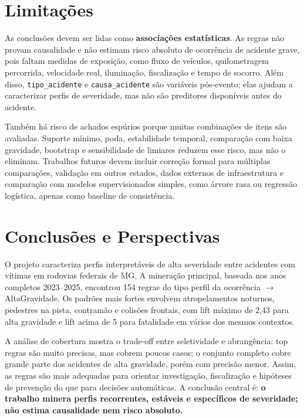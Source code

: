 \documentclass[12pt]{article}
\begin{document}
\section{Limitações}

As conclusões devem ser lidas como \textbf{associações estatísticas}. As regras não provam causalidade e não estimam risco absoluto de ocorrência de acidente grave, pois faltam medidas de exposição, como fluxo de veículos, quilometragem percorrida, velocidade real, iluminação, fiscalização e tempo de socorro. Além disso, \texttt{tipo\_acidente} e \texttt{causa\_acidente} são variáveis pós-evento; elas ajudam a caracterizar perfis de severidade, mas não são preditores disponíveis antes do acidente.

Também há risco de achados espúrios porque muitas combinações de itens são avaliadas. Suporte mínimo, poda, estabilidade temporal, comparação com baixa gravidade, bootstrap e sensibilidade de limiares reduzem esse risco, mas não o eliminam. Trabalhos futuros devem incluir correção formal para múltiplas comparações, validação em outros estados, dados externos de infraestrutura e comparação com modelos supervisionados simples, como árvore rasa ou regressão logística, apenas como baseline de consistência.

\section{Conclusões e Perspectivas}

O projeto caracteriza perfis interpretáveis de alta severidade entre acidentes com vítimas em rodovias federais de MG. A mineração principal, baseada nos anos completos 2023--2025, encontrou 154 regras do tipo perfil da ocorrência $\rightarrow$ AltaGravidade. Os padrões mais fortes envolvem atropelamentos noturnos, pedestres na pista, contramão e colisões frontais, com lift máximo de 2,43 para alta gravidade e lift acima de 5 para fatalidade em vários dos mesmos contextos.

A análise de cobertura mostra o trade-off entre seletividade e abrangência: top regras são muito precisas, mas cobrem poucos casos; o conjunto completo cobre grande parte dos acidentes de alta gravidade, porém com precisão menor. Assim, as regras são mais adequadas para orientar investigação, fiscalização e hipóteses de prevenção do que para decisões automáticas. A conclusão central é: \textbf{o trabalho minera perfis recorrentes, estáveis e específicos de severidade; não estima causalidade nem risco absoluto.}
\end{document}
